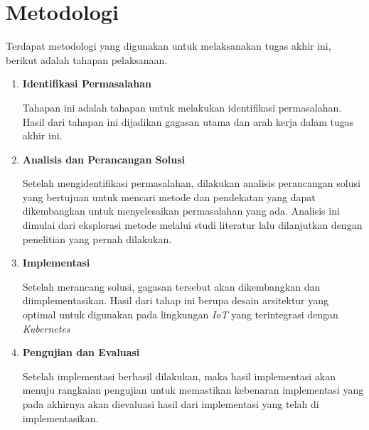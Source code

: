 \section{Metodologi}

Terdapat metodologi yang digunakan untuk melaksanakan tugas akhir ini, berikut adalah tahapan pelaksanaan.
\begin{enumerate}
  \item \textbf{Identifikasi Permasalahan}

        Tahapan ini adalah tahapan untuk melakukan identifikasi permasalahan. Hasil dari tahapan ini dijadikan gagasan utama dan arah kerja dalam tugas akhir ini.

  \item \textbf{Analisis dan Perancangan Solusi}

        Setelah mengidentifikasi permasalahan, dilakukan analisis perancangan solusi yang bertujuan untuk mencari metode dan pendekatan yang dapat dikembangkan untuk menyelesaikan permasalahan yang ada. Analisis ini dimulai dari eksplorasi metode melalui studi literatur lalu dilanjutkan dengan penelitian yang pernah dilakukan.

  \item \textbf{Implementasi}

        Setelah merancang solusi, gagasan tersebut akan dikembangkan dan diimplementasikan. Hasil dari tahap ini berupa desain arsitektur yang optimal untuk digunakan pada lingkungan \textit{IoT} yang terintegrasi dengan \textit{Kubernetes}

  \item \textbf{Pengujian dan Evaluasi}

        Setelah implementasi berhasil dilakukan, maka hasil implementasi akan menuju rangkaian pengujian untuk memastikan kebenaran implementasi yang pada akhirnya akan dievaluasi hasil dari implementasi yang telah di implementasikan.
\end{enumerate}